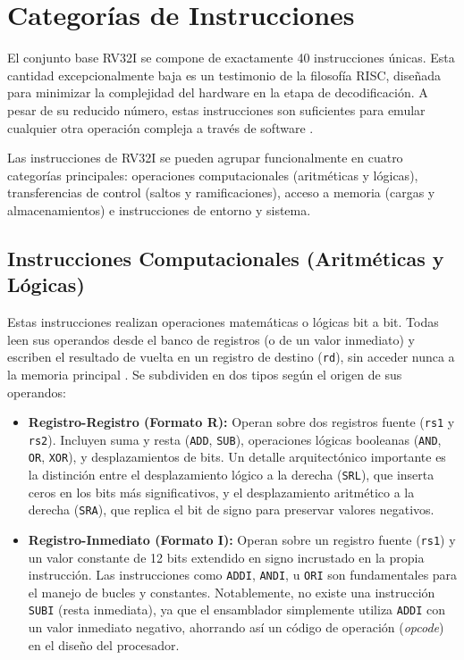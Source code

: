 \section{Categorías de Instrucciones}
\label{sec:CategoriasInstrucciones}

El conjunto base RV32I se compone de exactamente 40 instrucciones únicas. Esta cantidad excepcionalmente baja es un testimonio de la filosofía RISC, diseñada para minimizar la complejidad del hardware en la etapa de decodificación. A pesar de su reducido número, estas instrucciones son suficientes para emular cualquier otra operación compleja a través de software \cite{patterson2017riscv}.

Las instrucciones de RV32I se pueden agrupar funcionalmente en cuatro categorías principales: operaciones computacionales (aritméticas y lógicas), transferencias de control (saltos y ramificaciones), acceso a memoria (cargas y almacenamientos) e instrucciones de entorno y sistema.



\subsection{Instrucciones Computacionales (Aritméticas y Lógicas)}
Estas instrucciones realizan operaciones matemáticas o lógicas bit a bit. Todas leen sus operandos desde el banco de registros (o de un valor inmediato) y escriben el resultado de vuelta en un registro de destino (\texttt{rd}), sin acceder nunca a la memoria principal \cite{waterman2014riscv}. Se subdividen en dos tipos según el origen de sus operandos:

\begin{itemize}
    \item \textbf{Registro-Registro (Formato R):} Operan sobre dos registros fuente (\texttt{rs1} y \texttt{rs2}). Incluyen suma y resta (\texttt{ADD}, \texttt{SUB}), operaciones lógicas booleanas (\texttt{AND}, \texttt{OR}, \texttt{XOR}), y desplazamientos de bits. Un detalle arquitectónico importante es la distinción entre el desplazamiento lógico a la derecha (\texttt{SRL}), que inserta ceros en los bits más significativos, y el desplazamiento aritmético a la derecha (\texttt{SRA}), que replica el bit de signo para preservar valores negativos.
    \item \textbf{Registro-Inmediato (Formato I):} Operan sobre un registro fuente (\texttt{rs1}) y un valor constante de 12 bits extendido en signo incrustado en la propia instrucción. Las instrucciones como \texttt{ADDI}, \texttt{ANDI}, u \texttt{ORI} son fundamentales para el manejo de bucles y constantes. Notablemente, no existe una instrucción \texttt{SUBI} (resta inmediata), ya que el ensamblador simplemente utiliza \texttt{ADDI} con un valor inmediato negativo, ahorrando así un código de operación (\textit{opcode}) en el diseño del procesador.
\end{itemize}

